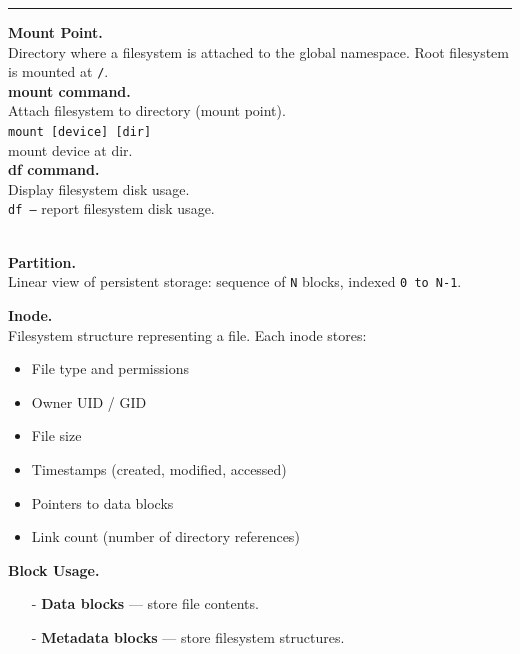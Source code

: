 \documentclass[8pt]{extarticle}
\begin{document}
\begin{minipage}[htp]{0.5\textwidth}
\begin{minipage}[t]{0.49\textwidth}
\begin{enumerate}[noitemsep,nolistsep,topsep=-10px,partopsep=0pt,parsep=0pt]
    \end{enumerate}
\end{minipage}
\hfill
\begin{minipage}[t]{0.49\textwidth}
    \hrule
    \vspace{5px}
    \noindent\textbf{Mount Point.} \\
Directory where a filesystem is attached to the global namespace. Root filesystem is mounted at \texttt{/}.\\
\textbf{mount command.} \\
Attach filesystem to directory (mount point).\\
\texttt{mount [device] [dir]} \\ mount device at dir.\\
\textbf{df command.} \\
Display filesystem disk usage.\\
\texttt{df --} report filesystem disk usage.\\
\end{minipage}\\[5px]
\noindent\textbf{Partition.} \\
Linear view of persistent storage: sequence of \texttt{N} blocks, indexed \texttt{0 to N-1}. \\
\begin{minipage}[t]{0.4\textwidth}
    \noindent\textbf{Inode.} \\
    Filesystem structure representing a file. Each inode stores:
    \begin{itemize}[noitemsep,topsep=0pt]
        \item File type and permissions
        \item Owner UID / GID
        \item File size
        \item Timestamps (created, modified, accessed)
        \item Pointers to data blocks
        \item Link count (number of directory references)
    \end{itemize}
\end{minipage}
\begin{minipage}[t]{0.55\textwidth}
\noindent\textbf{Block Usage.}
\begin{itemize}[noitemsep,topsep=0pt]
    \item[-] \textbf{Data blocks} — store file contents.
    \item[-] \textbf{Metadata blocks} — store filesystem structures.

\end{itemize}
\end{minipage}
\end{minipage}
\end{document}
